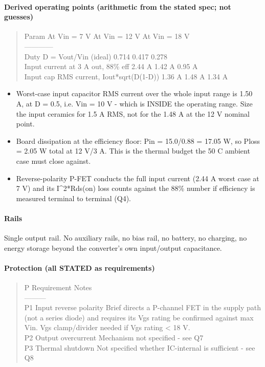 \documentclass[11pt,a4paper]{article}
\begin{document}
\paragraph*{Derived operating points (arithmetic from the stated spec; not guesses)}
\begin{quote}\small\ttfamily\raggedright
\textbar{} Param \textbar{} At Vin = 7 V \textbar{} At Vin = 12 V \textbar{} At Vin = 18 V \textbar{}\\
\textbar{}---\textbar{}---\textbar{}---\textbar{}---\textbar{}\\
\textbar{} Duty D = Vout/Vin (ideal) \textbar{} 0.714 \textbar{} 0.417 \textbar{} 0.278 \textbar{}\\
\textbar{} Input current at 3 A out, 88\% eff \textbar{} 2.44 A \textbar{} 1.42 A \textbar{} 0.95 A \textbar{}\\
\textbar{} Input cap RMS current, Iout{*}sqrt(D(1-D)) \textbar{} 1.36 A \textbar{} 1.48 A \textbar{} 1.34 A \textbar{}
\end{quote}
\begin{itemize}
\item Worst-case input capacitor RMS current over the whole input range is 1.50 A, at D = 0.5,
i.e. Vin = 10 V - which is INSIDE the operating range. Size the input ceramics for 1.5 A
RMS, not for the 1.48 A at the 12 V nominal point.
\item Board dissipation at the efficiency floor: Pin = 15.0/0.88 = 17.05 W, so Ploss = 2.05 W
total at 12 V/3 A. This is the thermal budget the 50 C ambient case must close against.
\item Reverse-polarity P-FET conducts the full input current (2.44 A worst case at 7 V) and its
I\textasciicircum{}2{*}Rds(on) loss counts against the 88\% number if efficiency is measured terminal to
terminal (Q4).
\end{itemize}
\paragraph*{Rails}
Single output rail. No auxiliary rails, no bias rail, no battery, no charging, no energy storage beyond the converter's own input/output capacitance.

\paragraph*{Protection (all STATED as requirements)}
\begin{quote}\small\ttfamily\raggedright
\textbar{} P \textbar{} Requirement \textbar{} Notes \textbar{}\\
\textbar{}---\textbar{}---\textbar{}---\textbar{}\\
\textbar{} P1 \textbar{} Input reverse polarity \textbar{} Brief directs a P-channel FET in the supply path (not a series diode) and requires its Vgs rating be confirmed against max Vin. Vgs clamp/divider needed if \textbar{}Vgs\textbar{} rating \textless{} 18 V. \textbar{}\\
\textbar{} P2 \textbar{} Output overcurrent \textbar{} Mechanism not specified - see Q7 \textbar{}\\
\textbar{} P3 \textbar{} Thermal shutdown \textbar{} Not specified whether IC-internal is sufficient - see Q8 \textbar{}
\end{quote}
\end{document}
